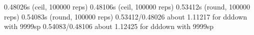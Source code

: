 0.48026s (ceil, 100000 reps)                               0.48106s (ceil, 100000 reps)                              
0.53412s (round, 100000 reps)                              0.54083s (round, 100000 reps)                             
0.53412/0.48026 about 1.11217 for dddown with 9999sp       0.54083/0.48106 about 1.12425 for dddown with 9999sp      



















































































































